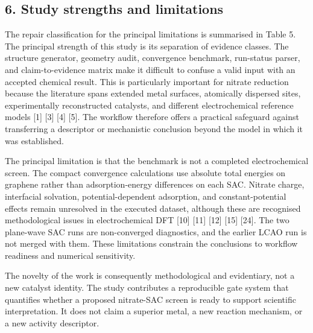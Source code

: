\documentclass[
]{article}
\begin{document}
\hypertarget{study-strengths-and-limitations}{%
\subsection{6. Study strengths and
limitations}\label{study-strengths-and-limitations}}

The repair classification for the principal limitations is summarised in
Table 5. The principal strength of this study is its separation of
evidence classes. The structure generator, geometry audit, convergence
benchmark, run-status parser, and claim-to-evidence matrix make it
difficult to confuse a valid input with an accepted chemical result.
This is particularly important for nitrate reduction because the
literature spans extended metal surfaces, atomically dispersed sites,
experimentally reconstructed catalysts, and different electrochemical
reference models {[}1{]} {[}3{]} {[}4{]} {[}5{]}. The workflow therefore
offers a practical safeguard against transferring a descriptor or
mechanistic conclusion beyond the model in which it was established.

The principal limitation is that the benchmark is not a completed
electrochemical screen. The compact convergence calculations use
absolute total energies on graphene rather than adsorption-energy
differences on each SAC. Nitrate charge, interfacial solvation,
potential-dependent adsorption, and constant-potential effects remain
unresolved in the executed dataset, although these are recognised
methodological issues in electrochemical DFT {[}10{]} {[}11{]} {[}12{]}
{[}15{]} {[}24{]}. The two plane-wave SAC runs are non-converged
diagnostics, and the earlier LCAO run is not merged with them. These
limitations constrain the conclusions to workflow readiness and
numerical sensitivity.

The novelty of the work is consequently methodological and evidentiary,
not a new catalyst identity. The study contributes a reproducible gate
system that quantifies whether a proposed nitrate-SAC screen is ready to
support scientific interpretation. It does not claim a superior metal, a
new reaction mechanism, or a new activity descriptor.
\end{document}
